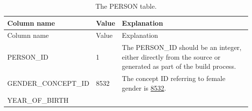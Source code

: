 \documentclass[11pt]{book}
\theoremstyle{definition}
\theoremstyle{definition}
\theoremstyle{definition}
\theoremstyle{remark}
\begin{document}
\begin{longtable}[]{@{}lll@{}}
\caption{\label{tab:person} The PERSON table.}\tabularnewline
\toprule
\begin{minipage}[b]{0.28\columnwidth}\raggedright
Column name\strut
\end{minipage} & \begin{minipage}[b]{0.15\columnwidth}\raggedright
Value\strut
\end{minipage} & \begin{minipage}[b]{0.49\columnwidth}\raggedright
Explanation\strut
\end{minipage}\tabularnewline
\midrule
\endfirsthead
\toprule
\begin{minipage}[b]{0.28\columnwidth}\raggedright
Column name\strut
\end{minipage} & \begin{minipage}[b]{0.15\columnwidth}\raggedright
Value\strut
\end{minipage} & \begin{minipage}[b]{0.49\columnwidth}\raggedright
Explanation\strut
\end{minipage}\tabularnewline
\midrule
\endhead
\begin{minipage}[t]{0.28\columnwidth}\raggedright
PERSON\_ID\strut
\end{minipage} & \begin{minipage}[t]{0.15\columnwidth}\raggedright
1\strut
\end{minipage} & \begin{minipage}[t]{0.49\columnwidth}\raggedright
The PERSON\_ID should be an integer, either directly from the source or generated as part of the build process.\strut
\end{minipage}\tabularnewline
\begin{minipage}[t]{0.28\columnwidth}\raggedright
GENDER\_CONCEPT\_ID\strut
\end{minipage} & \begin{minipage}[t]{0.15\columnwidth}\raggedright
8532\strut
\end{minipage} & \begin{minipage}[t]{0.49\columnwidth}\raggedright
The concept ID referring to female gender is \href{http://athena.ohdsi.org/search-terms/terms/8532}{8532}.\strut
\end{minipage}\tabularnewline
\begin{minipage}[t]{0.28\columnwidth}\raggedright
YEAR\_OF\_BIRTH\strut
\end{minipage} & \begin{minipage}[t]{0.15\columnwidth}\raggedright

\end{minipage}
\end{longtable}
\end{document}

